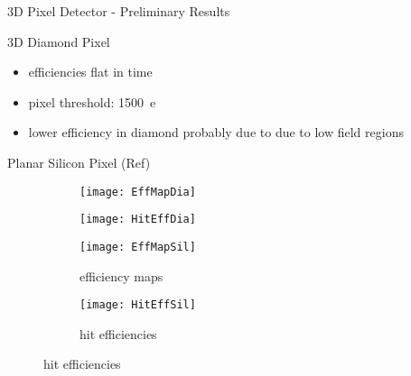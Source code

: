 \begin{frame}{3D Pixel Detector - Preliminary Results}

	\begin{minipage}{.4\textwidth}
		\hfill 3D Diamond Pixel\\
		
		\vspace*{20pt}
		\color{black}
		\begin{itemize}
			\color{black}
			\item efficiencies flat in time
			\item pixel threshold: \SI{1500}{e}
			\item lower efficiency in diamond probably due to due to low field regions
		\end{itemize}
		\vspace*{20pt}
		
		\hfill Planar Silicon Pixel (Ref)\\

	\end{minipage}
	\hspace*{2pt}
	\begin{minipage}{.56\textwidth}
		\begin{figure}[h]
			\centering
			\begin{subfigure}{0.45\textwidth}  
				\centering 
				\texttt{[image: EffMapDia]}
			\end{subfigure}
			\begin{subfigure}{0.45\textwidth} 
				\centering 
				\texttt{[image: HitEffDia]}
			\end{subfigure}
			\begin{subfigure}{0.45\textwidth}  
				\centering 
				\texttt{[image: EffMapSil]}
				\caption{efficiency maps}
			\end{subfigure}
			\begin{subfigure}{0.45\textwidth} 
				\centering 
				\texttt{[image: HitEffSil]}
				\caption{hit efficiencies}
			\end{subfigure}
		\end{figure}
	\end{minipage}
 	
\end{frame}
